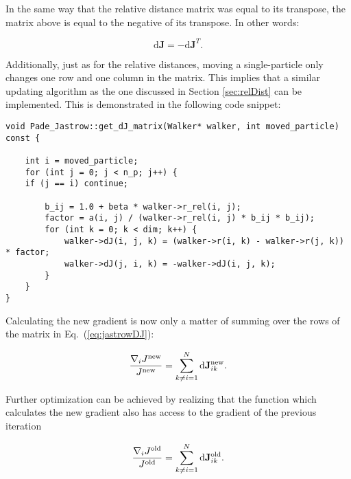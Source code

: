 In the same way that the relative distance matrix was equal to its transpose, the matrix above is equal to the negative of its transpose. In other words:

\begin{equation}
 \mathrm{d}\mathbf{J} = -\mathrm{d}\mathbf{J}^T.
\end{equation}

Additionally, just as for the relative distances, moving a single-particle only changes one row and one column in the matrix. This implies that a similar updating algorithm as the one discussed in Section \ref{sec:relDist} can be implemented. This is demonstrated in the following code snippet:

\vspace{0.25cm}
\begin{lstlisting}[caption={The updating algorithm for the three-dimensional matrix used in the Padé Jastrow gradient. In line 11, the symmetry property is exploited by setting the transposed term equal to the negative of the already calculated term.}]
void Pade_Jastrow::get_dJ_matrix(Walker* walker, int moved_particle) const {
    
    int i = moved_particle;
    for (int j = 0; j < n_p; j++) {
	if (j == i) continue;
	
        b_ij = 1.0 + beta * walker->r_rel(i, j);
        factor = a(i, j) / (walker->r_rel(i, j) * b_ij * b_ij);
        for (int k = 0; k < dim; k++) {
            walker->dJ(i, j, k) = (walker->r(i, k) - walker->r(j, k)) * factor;
            walker->dJ(j, i, k) = -walker->dJ(i, j, k);
        }
    }
}
\end{lstlisting}


Calculating the new gradient is now only a matter of summing over the rows of the matrix in Eq.~(\ref{eq:jastrowDJ}):

\begin{equation}
 \frac{\nabla_i J^\mathrm{new}}{J^\mathrm{new}} = \sum_{k \ne i = 1}^N \mathrm{d}\mathbf{J}^\mathrm{new}_{ik}. \label{eq:jastrowGradDJnew}
\end{equation}

Further optimization can be achieved by realizing that the function which calculates the new gradient also has access to the gradient of the previous iteration

\begin{equation}
\frac{\nabla_i J^\mathrm{old}}{J^\mathrm{old}} = \sum_{k \ne i = 1}^N \mathrm{d}\mathbf{J}^\mathrm{old}_{ik}.\label{eq:jastrowGraDJold}
\end{equation}

